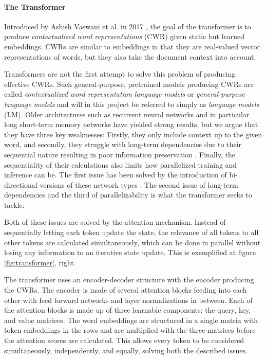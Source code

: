 \documentclass[main.tex]{subfiles}
\begin{document}
\paragraph{The Transformer}
Introduced by Ashish Vaswani et al. in 2017 \cite{vaswani2017att}, the goal of the transformer is to produce \emph{contextualized word representations} (CWR) given static but learned embeddings.
CWRs are similar to embeddings in that they are real-valued vector representations of words, but they also take the document context into account.

Transformers are not the first attempt to solve this problem of producing effective CWRs.
Such general-purpose, pretrained models producing CWRs are called  \emph{contextualized word representation language models} or \emph{general-purpose language models} \cite[Ch. 2]{birk2020knowledge} and will in this project be referred to simply as \emph{language models} (LM).
Older architectures such as recurrent neural networks \cite[Ch. 10]{Goodfellow-et-al-2016} and in particular long short-term memory networks \cite{hochreiter1997lstm} have yielded strong results, but we argue that they have three key weaknesses:
Firstly, they only include context up to the given word, and secondly, they struggle with long-term dependencies due to their sequential nature resulting in poor information preservation \cite{Goodfellow-et-al-2016}.
Finally, the sequentiality of their calculations also limits how parallelized training and inference can be.
The first issue has been solved by the introduction of bi-directional versions of these network types \cite{schuster1997birnn}.
The second issue of long-term dependencies and the third of parallelizability is what the transformer seeks to tackle.

Both of these issues are solved by the attention mechanism.
Instead of sequentially letting each token update the state, the relevance of all tokens to all other tokens are calculated simultaneously, which can be done in parallel without losing any information to an iterative state update.
This is exemplified at figure \ref{fig:transformer}, right.

The transformer uses an encoder-decoder structure with the encoder producing the CWRs.
The encoder is made of several attention blocks feeding into each other with feed forward networks and layer normalizations in between.
Each of the attention blocks is made up of three learnable components: the query, key, and value matrices.
The word embeddings are structured in a single matrix with token embeddings in the rows and are multiplied with the three matrices before the attention scores are calculated.
This allows every token to be considered simultaneously, independently, and equally, solving both the described issues.
\cite{vaswani2017att}
\end{document}
